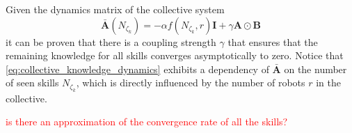 Given the dynamics matrix of the collective system
\begin{equation}
	\bar{\bm{A}}\left(N_{\zeta_k}\right) =-\alpha  f\left(N_{\zeta_k},r\right) \bm{I} + \gamma \bm{A} \odot \bm{B} 
\end{equation} 
it can be proven that there is a coupling strength $\gamma$ that ensures that the remaining knowledge for all skills converges asymptotically to zero. Notice that \eqref{eq:collective_knowledge_dynamics} exhibits a dependency of $\bar{\bm{A}}$ on the number of seen skills $N_{\zeta_k}$, which is directly influenced by the number of robots $r$ in the collective.

\TODO \textcolor{red}{is there an approximation of the convergence rate of all the skills?}







